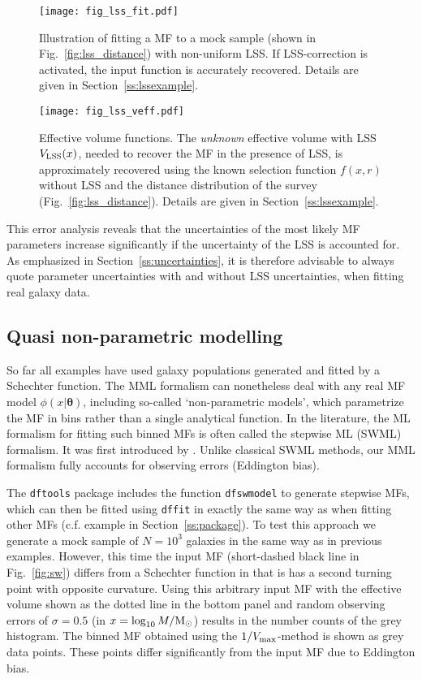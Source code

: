 \documentclass[a4paper,fleqn,usenatbib]{mnras}
\newcommand{\msun}{{\rm M}_{\odot}}
\newcommand{\dftools}{\texttt{dftools}\xspace}
\newcommand{\vefflss}{V_{\rm LSS}}%
\newcommand{\vmax}{V_{\rm max}}
\newcommand{\fig}[1]{Fig.~\ref{fig:#1}}
\renewcommand{\ss}[1]{Section~\ref{ss:#1}}
\newcommand{\cf}{c.f.\xspace}
\newcommand{\para}{{\bm{\theta}}}
\begin{document}
\begin{figure}
\begin{center}
\texttt{[image: fig\_lss\_fit.pdf]}
\caption{Illustration of fitting a MF to a mock sample (shown in \fig{lss_distance}) with non-uniform LSS. If LSS-correction is activated, the input function is accurately recovered. Details are given in \ss{lssexample}.}\label{fig:lss_fit}
\end{center}
\end{figure}

\begin{figure}
\begin{center}
\texttt{[image: fig\_lss\_veff.pdf]}
\caption{Effective volume functions. The \emph{unknown} effective volume with LSS $\vefflss(x)$, needed to recover the MF in the presence of LSS, is approximately recovered using the known selection function $f(x,r)$ without LSS and the distance distribution of the survey (\fig{lss_distance}). Details are given in \ss{lssexample}.}\label{fig:lss_veff}
\end{center}
\end{figure}

This error analysis reveals that the uncertainties of the most likely MF parameters increase significantly if the uncertainty of the LSS is accounted for. As emphasized in \ss{uncertainties}, it is therefore advisable to always quote parameter uncertainties with and without LSS uncertainties, when fitting real galaxy data.

\subsection{Quasi non-parametric modelling}\label{ss:nonpara}

So far all examples have used galaxy populations generated and fitted by a Schechter function. The MML formalism can nonetheless deal with any real MF model $\phi(x|\para)$, including so-called `non-parametric models', which parametrize the MF in bins rather than a single analytical function. In the literature, the ML formalism for fitting such binned MFs is often called the stepwise ML (SWML) formalism. It was first introduced by \cite{Efstathiou1988}. Unlike classical SWML methods, our MML formalism fully accounts for observing errors (Eddington bias).

The \dftools package includes the function \texttt{dfswmodel} to generate stepwise MFs, which can then be fitted using \texttt{dffit} in exactly the same way as when fitting other MFs (\cf example in \ss{package}). To test this approach we generate a mock sample of $N=10^3$ galaxies in the same way as in previous examples. However, this time the input MF (short-dashed black line in \fig{sw}) differs from a Schechter function in that is has a second turning point with opposite curvature. Using this arbitrary input MF with the effective volume shown as the dotted line in the bottom panel and random observing errors of $\sigma=0.5$ (in $x=\log_{10}M/\msun$) results in the number counts of the grey histogram. The binned MF obtained using the $1/\vmax$-method is shown as grey data points. These points differ significantly from the input MF due to Eddington bias.
\end{document}
